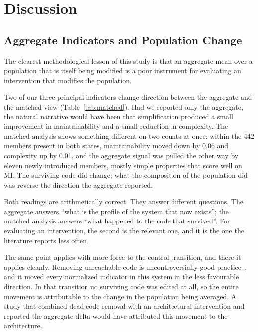 \documentclass{sbc2019}%
\begin{document}
\FloatBarrier

\section{Discussion}\label{sec:discussion}

\subsection{Aggregate Indicators and Population Change}

The clearest methodological lesson of this study is that an aggregate mean over
a population that is itself being modified is a poor instrument for evaluating
an intervention that modifies the population.

Two of our three principal indicators change direction between the aggregate and
the matched view (Table~\ref{tab:matched}). Had we reported only the aggregate,
the natural narrative would have been that simplification produced a small
improvement in maintainability and a small reduction in complexity. The matched
analysis shows something different on two counts at once: within the 442 members
present in both states, maintainability moved down by 0.06 and complexity up by
0.01, and the aggregate signal was pulled the other way by eleven newly
introduced members, mostly simple properties that score well on MI\@. The
surviving code did change; what the composition of the population did was
reverse the direction the aggregate reported.

Both readings are arithmetically correct. They answer different questions. The
aggregate answers ``what is the profile of the system that now exists''; the
matched analysis answers ``what happened to the code that survived''. For
evaluating an intervention, the second is the relevant one, and it is the one
the literature reports less often.

The same point applies with more force to the control transition, and there it
applies cleanly. Removing unreachable code is uncontroversially good practice~\cite{romano2020,eder2012}, and it moved every normalized indicator in this
system in the less favourable direction. In that transition no surviving code was
edited at all, so the entire movement is attributable to the change in the
population being averaged. A study that
combined dead-code removal with an architectural intervention and reported the
aggregate delta would have attributed this movement to the architecture.
\end{document}
